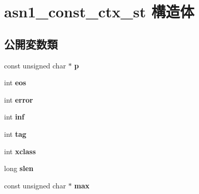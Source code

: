 \hypertarget{structasn1__const__ctx__st}{}\section{asn1\+\_\+const\+\_\+ctx\+\_\+st 構造体}
\label{structasn1__const__ctx__st}
\subsection*{公開変数類}
\begin{DoxyCompactItemize}
\item 
\hypertarget{structasn1__const__ctx__st_a7b1479e0de9e547ae50c83fa4ffbed07}{}const unsigned char $\ast$ {\bfseries p}\label{structasn1__const__ctx__st_a7b1479e0de9e547ae50c83fa4ffbed07}

\item 
\hypertarget{structasn1__const__ctx__st_a649ad5c068ec65b6d8cee56b95619fc9}{}int {\bfseries eos}\label{structasn1__const__ctx__st_a649ad5c068ec65b6d8cee56b95619fc9}

\item 
\hypertarget{structasn1__const__ctx__st_aa281e6701fb7934c2cca8c7a686372f8}{}int {\bfseries error}\label{structasn1__const__ctx__st_aa281e6701fb7934c2cca8c7a686372f8}

\item 
\hypertarget{structasn1__const__ctx__st_a29867a3ac1efeae0c85e6de7989ce000}{}int {\bfseries inf}\label{structasn1__const__ctx__st_a29867a3ac1efeae0c85e6de7989ce000}

\item 
\hypertarget{structasn1__const__ctx__st_afecdc50f4ad882589b5003b96e60a7ef}{}int {\bfseries tag}\label{structasn1__const__ctx__st_afecdc50f4ad882589b5003b96e60a7ef}

\item 
\hypertarget{structasn1__const__ctx__st_ae7e37b4b1a3f13d4b220f7ddf084b662}{}int {\bfseries xclass}\label{structasn1__const__ctx__st_ae7e37b4b1a3f13d4b220f7ddf084b662}

\item 
\hypertarget{structasn1__const__ctx__st_ae0e8c4c5c13f58bf7ecb108b7c5b5e71}{}long {\bfseries slen}\label{structasn1__const__ctx__st_ae0e8c4c5c13f58bf7ecb108b7c5b5e71}

\item 
\hypertarget{structasn1__const__ctx__st_a800940377825d8d1aa2a2040ce78d908}{}const unsigned char $\ast$ {\bfseries max}\label{structasn1__const__ctx__st_a800940377825d8d1aa2a2040ce78d908}


\end{DoxyCompactItemize}
